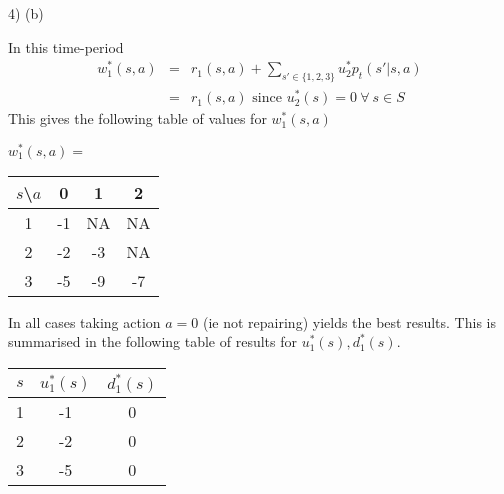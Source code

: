 \documentclass[11pt,a4paper]{article}
\begin{document}
\begin{answer}{4) (b)}
\begin{itemize}
    \par In this time-period
    \[\begin{array}{rcl}
      w_1^*(s,a)&=&r_1(s,a)+\sum_{s'\in\{1,2,3\}}u_2^*p_t(s'|s,a)\\
                &=&r_1(s,a)\text{ since }u_{2}^*(s)=0\ \forall\ s\in S
    \end{array}\]
    This gives the following table of values for $w_1^*(s,a)$
    \begin{center}
      $w_1^*(s,a)=$
      \begin{tabular}{c|ccc}
        $s$\textbackslash $a$&0&1&2\\\hline
        1&-1&NA&NA\\
        2&-2&-3&NA\\
        3&-5&-9&-7
      \end{tabular}
    \end{center}
    In all cases taking action $a=0$ (ie not repairing) yields the best results. This is summarised in the following table of results for $u_1^*(s),d_1^*(s)$.
    \begin{center}
      \begin{tabular}{c|c|c}
        $s$&$u_1^*(s)$&$d_1^*(s)$\\\hline
        1&-1&0\\
        2&-2&0\\
        3&-5&0
      \end{tabular}
    \end{center}


\end{itemize}
\end{answer}
\end{document}
